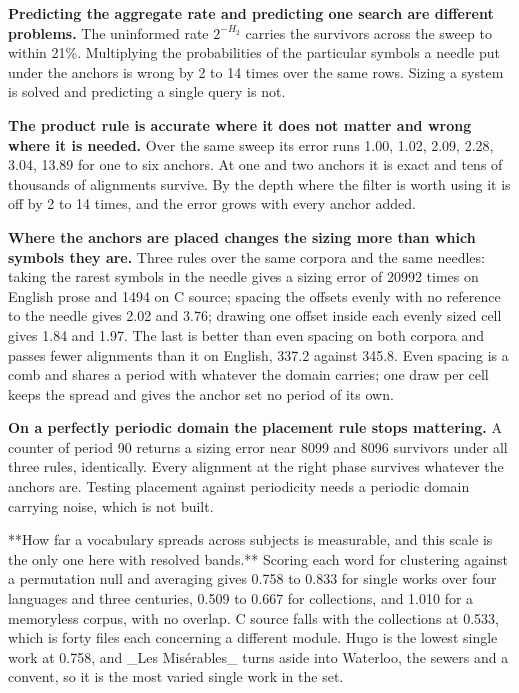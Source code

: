 \textbf{Predicting the aggregate rate and predicting one search are different problems.} The uninformed rate \(2^{-H_2}\) carries the survivors across the sweep to within 21\%. Multiplying the probabilities of the particular symbols a needle put under the anchors is wrong by 2 to 14 times over the same rows. Sizing a system is solved and predicting a single query is not.

\textbf{The product rule is accurate where it does not matter and wrong where it is needed.} Over the same sweep its error runs 1.00, 1.02, 2.09, 2.28, 3.04, 13.89 for one to six anchors. At one and two anchors it is exact and tens of thousands of alignments survive. By the depth where the filter is worth using it is off by 2 to 14 times, and the error grows with every anchor added.

\textbf{Where the anchors are placed changes the sizing more than which symbols they are.} Three rules over the same corpora and the same needles: taking the rarest symbols in the needle gives a sizing error of 20992 times on English prose and 1494 on C source; spacing the offsets evenly with no reference to the needle gives 2.02 and 3.76; drawing one offset inside each evenly sized cell gives 1.84 and 1.97. The last is better than even spacing on both corpora and passes fewer alignments than it on English, 337.2 against 345.8. Even spacing is a comb and shares a period with whatever the domain carries; one draw per cell keeps the spread and gives the anchor set no period of its own.

\textbf{On a perfectly periodic domain the placement rule stops mattering.} A counter of period 90 returns a sizing error near 8099 and 8096 survivors under all three rules, identically. Every alignment at the right phase survives whatever the anchors are. Testing placement against periodicity needs a periodic domain carrying noise, which is not built.

**How far a vocabulary spreads across subjects is measurable, and this scale is the only one here with resolved bands.** Scoring each word for clustering against a permutation null and averaging gives 0.758 to 0.833 for single works over four languages and three centuries, 0.509 to 0.667 for collections, and 1.010 for a memoryless corpus, with no overlap. C source falls with the collections at 0.533, which is forty files each concerning a different module. Hugo is the lowest single work at 0.758, and \_Les Misérables\_ turns aside into Waterloo, the sewers and a convent, so it is the most varied single work in the set.


